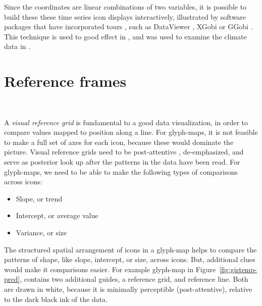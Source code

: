 \documentclass[oneside]{article}
\begin{document}
Since the coordinates are linear combinations of two variables, it is possible to build these these time series icon displays interactively, illustrated by software packages that have incorporated tours \citep{cook:2006}, such as DataViewer \citep{buja:1986}, XGobi \citep{swayne:1991} or GGobi \citep{swayne:2003}.  This technique is used to good effect in \citet{buja:1996a}, and was used to examine the climate data in \citet{hobbs:2010}.







\section{Reference frames}~\label{sec:reference}

A \emph{visual reference grid} \citep{cleveland:1993a} is fundamental
to a good data visualization, in order to compare values mapped to
position along a line. For glyph-maps, it is not feasible to make a
full set of axes for each icon, because these would dominate the
picture. Visual reference grids need to be post-attentive
\citep{healey}, de-emphasized, and serve as posterior look up after
the patterns in the data have been read. For glyph-maps, we need to be
able to make the following types of comparisons across icons:

\begin{itemize} \itemsep 0in
\item Slope, or trend
\item Intercept, or average value
\item Variance, or size
\end{itemize}

The structured spatial arrangement of icons in a glyph-map helps to compare the patterns of shape, like slope, intercept, or size, across icons. But, additional clues would make it comparisons easier. For example glyph-map in Figure~\ref{fig:gistemp-pred}, contains two additional guides, a reference grid, and reference line. Both are drawn in white, because it is minimally perceptible (post-attentive), relative to the dark black ink of the data.
\end{document}
